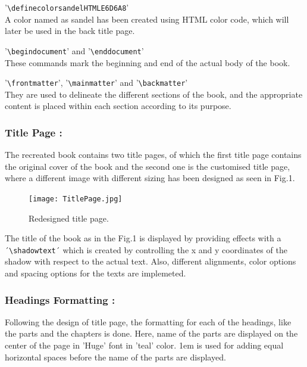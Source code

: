 \documentclass[runningheads]{llncs}
\begin{document}
'\texttt{\textbackslash definecolor{sandel}{HTML}{E6D6A8}}' \\
A color named as sandel has been created using HTML color code, which will later be used in the back title page.   

'\texttt{\textbackslash begin{document}}' and '\texttt{\textbackslash end{document}}' \\
These commands mark the beginning and end of the actual body of the book.

'\texttt{\textbackslash frontmatter}', '\texttt{\textbackslash mainmatter}' and '\texttt{\textbackslash backmatter}' \\
They are used to delineate the different sections of the book, and the appropriate content is placed within each section according to its purpose.


\subsubsection{Title Page : } 
The recreated book contains two title pages, of which the first title page contains the original cover of the book and the second one is the customised title page, where a different image with different sizing has been designed as seen in Fig.1. 

    \begin{figure}
    	\centering
    	\texttt{[image: TitlePage.jpg]}
    	\caption{Redesigned title page.}
    \end{figure}

The title of the book as in the Fig.1 is displayed by providing effects with a ´\texttt{\textbackslash shadowtext}´ which is created by controlling the x and y coordinates of the shadow with respect to the actual text. Also, different alignments, color options and spacing options for the texts are implemeted. 


\subsubsection{Headings Formatting : }
Following the design of title page, the formatting for each of the headings, like the parts and the chapters is done. Here, name of the parts are displayed on the center of the page in 'Huge' font in 'teal' color. {1em} is used for adding equal horizontal spaces before the name of the parts are displayed.
\end{document}
